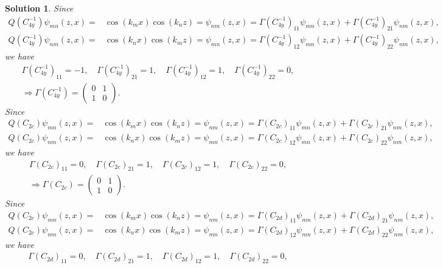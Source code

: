 \documentclass[UTF8,10pt,a4paper]{article}
\theoremstyle{Problem}
\theoremstyle{Solution}
\newtheorem*{sol}{Solution}
\begin{document}
\begin{sol}
    Since
    \begin{align}
        Q(C_{4y}^{-1})\psi_{mn}(z,x)=&\cos(k_mx)\cos(k_nz)=\psi_{nm}(z,x)=\Gamma(C_{4y}^{-1})_{11}\psi_{mn}(z,x)+\Gamma(C_{4y}^{-1})_{21}\psi_{nm}(z,x),\\
        Q(C_{4y}^{-1})\psi_{nm}(z,x)=&\cos(k_nx)\cos(k_mz)=\psi_{mn}(z,x)=\Gamma(C_{4y}^{-1})_{12}\psi_{mn}(z,x)+\Gamma(C_{4y}^{-1})_{22}\psi_{nm}(z,x),
    \end{align}
    we have
    \begin{gather}
        \Gamma(C_{4y}^{-1})_{11}=-1,\quad\Gamma(C_{4y}^{-1})_{21}=1,\quad\Gamma(C_{4y}^{-1})_{12}=1,\quad\Gamma(C_{4y}^{-1})_{22}=0,\\
        \Longrightarrow\Gamma(C_{4y}^{-1})=\left(\begin{matrix}
            0&1\\
            1&0
        \end{matrix}\right).
    \end{gather}
    Since
    \begin{align}
        Q(C_{2c})\psi_{mn}(z,x)=&\cos(k_mx)\cos(k_nz)=\psi_{nm}(z,x)=\Gamma(C_{2c})_{11}\psi_{mn}(z,x)+\Gamma(C_{2c})_{21}\psi_{nm}(z,x),\\
        Q(C_{2c})\psi_{nm}(z,x)=&\cos(k_nx)\cos(k_mz)=\psi_{mn}(z,x)=\Gamma(C_{2c})_{12}\psi_{mn}(z,x)+\Gamma(C_{2c})_{22}\psi_{nm}(z,x),
    \end{align}
    we have
    \begin{gather}
        \Gamma(C_{2c})_{11}=0,\quad\Gamma(C_{2c})_{21}=1,\quad\Gamma(C_{2c})_{12}=1,\quad\Gamma(C_{2c})_{22}=0,\\
        \Longrightarrow\Gamma(C_{2c})=\left(\begin{matrix}
            0&1\\
            1&0
        \end{matrix}\right).
    \end{gather}
    Since
    \begin{align}
        Q(C_{2c})\psi_{mn}(z,x)=&\cos(k_mx)\cos(k_nz)=\psi_{nm}(z,x)=\Gamma(C_{2d})_{11}\psi_{mn}(z,x)+\Gamma(C_{2d})_{21}\psi_{nm}(z,x),\\
        Q(C_{2c})\psi_{nm}(z,x)=&\cos(k_nx)\cos(k_mz)=\psi_{mn}(z,x)=\Gamma(C_{2d})_{12}\psi_{mn}(z,x)+\Gamma(C_{2d})_{22}\psi_{nm}(z,x),
    \end{align}
    we have
    \begin{gather}
        \Gamma(C_{2d})_{11}=0,\quad\Gamma(C_{2d})_{21}=1,\quad\Gamma(C_{2d})_{12}=1,\quad\Gamma(C_{2d})_{22}=0,\\

\end{gather}
\end{sol}
\end{document}
